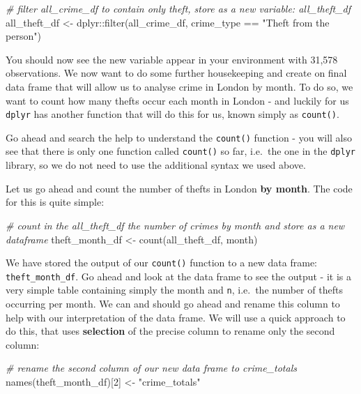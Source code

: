 \documentclass[
]{book}
\newenvironment{Shaded}{\begin{snugshade}}{\end{snugshade}}
\newcommand{\CommentTok}[1]{\textcolor[rgb]{0.56,0.35,0.01}{\textit{#1}}}
\newcommand{\DecValTok}[1]{\textcolor[rgb]{0.00,0.00,0.81}{#1}}
\newcommand{\FunctionTok}[1]{\textcolor[rgb]{0.00,0.00,0.00}{#1}}
\newcommand{\NormalTok}[1]{#1}
\newcommand{\OtherTok}[1]{\textcolor[rgb]{0.56,0.35,0.01}{#1}}
\newcommand{\SpecialCharTok}[1]{\textcolor[rgb]{0.00,0.00,0.00}{#1}}
\newcommand{\StringTok}[1]{\textcolor[rgb]{0.31,0.60,0.02}{#1}}
\begin{document}
\begin{Shaded}
\begin{Highlighting}[]
\CommentTok{\# filter all\_crime\_df to contain only theft, store as a new variable: all\_theft\_df}
\NormalTok{all\_theft\_df }\OtherTok{\textless{}{-}}\NormalTok{ dplyr}\SpecialCharTok{::}\FunctionTok{filter}\NormalTok{(all\_crime\_df, crime\_type }\SpecialCharTok{==} \StringTok{"Theft from the person"}\NormalTok{)}
\end{Highlighting}
\end{Shaded}

You should now see the new variable appear in your environment with 31,578 observations. We now want to do some further housekeeping and create on final data frame that will allow us to analyse crime in London by month. To do so, we want to count how many thefts occur each month in London - and luckily for us \texttt{dplyr} has another function that will do this for us, known simply as \texttt{count()}.

Go ahead and search the help to understand the \texttt{count()} function - you will also see that there is only one function called \texttt{count()} so far, i.e.~the one in the \texttt{dplyr} library, so we do not need to use the additional syntax we used above.

Let us go ahead and count the number of thefts in London \textbf{by month}. The code for this is quite simple:

\begin{Shaded}
\begin{Highlighting}[]
\CommentTok{\# count in the all\_theft\_df the number of crimes by month and store as a new dataframe}
\NormalTok{theft\_month\_df }\OtherTok{\textless{}{-}} \FunctionTok{count}\NormalTok{(all\_theft\_df, month)}
\end{Highlighting}
\end{Shaded}

We have stored the output of our \texttt{count()} function to a new data frame: \texttt{theft\_month\_df}. Go ahead and look at the data frame to see the output - it is a very simple table containing simply the month and \texttt{n}, i.e.~the number of thefts occurring per month. We can and should go ahead and rename this column to help with our interpretation of the data frame. We will use a quick approach to do this, that uses \textbf{selection} of the precise column to rename only the second column:

\begin{Shaded}
\begin{Highlighting}[]
\CommentTok{\# rename the second column of our new data frame to crime\_totals}
\FunctionTok{names}\NormalTok{(theft\_month\_df)[}\DecValTok{2}\NormalTok{] }\OtherTok{\textless{}{-}} \StringTok{"crime\_totals"}
\end{Highlighting}
\end{Shaded}
\end{document}
